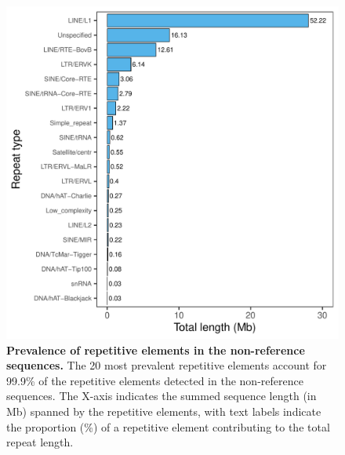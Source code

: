 \documentclass[../main.tex]{subfiles}
\begin{document}
\begin{flushleft}
\begin{figure}[!htb]
    \centering
    \includegraphics[width=\textwidth]{paper3/supplement/sp47.pdf}
    \caption[Repetitive elements in the pangenome]{\textbf{Prevalence of repetitive elements in the non-reference sequences.}
    \small{The 20 most prevalent repetitive elements account for 99.9\% of the repetitive elements detected in the non-reference sequences. The X-axis indicates the summed sequence length (in Mb) spanned by the repetitive elements, with text labels indicate the proportion (\%) of a repetitive element contributing to the total repeat length. }}
    \label{sup_fig:s47}
\end{figure}


\end{flushleft}
\end{document}

